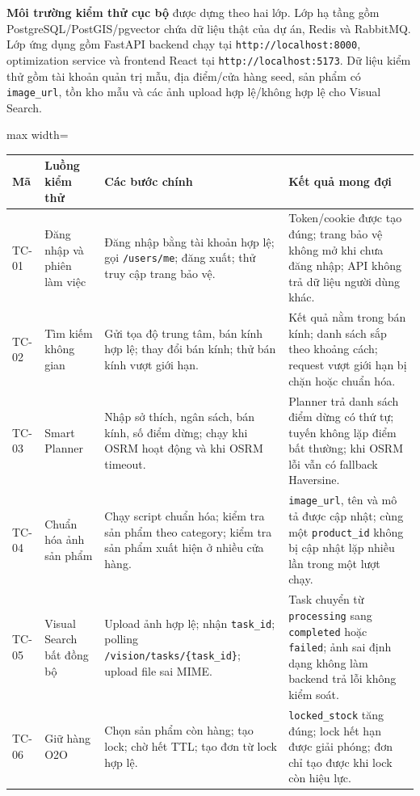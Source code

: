 \documentclass[12pt, a4paper]{article}
\begin{document}
\textbf{Môi trường kiểm thử cục bộ} được dựng theo hai lớp. Lớp hạ tầng gồm PostgreSQL/PostGIS/pgvector chứa dữ liệu thật của dự án, Redis và RabbitMQ. Lớp ứng dụng gồm FastAPI backend chạy tại \texttt{http://localhost:8000}, optimization service và frontend React tại \texttt{http://localhost:5173}. Dữ liệu kiểm thử gồm tài khoản quản trị mẫu, địa điểm/cửa hàng seed, sản phẩm có \texttt{image\_url}, tồn kho mẫu và các ảnh upload hợp lệ/không hợp lệ cho Visual Search.

\begin{table}[H]
\centering
\renewcommand{\arraystretch}{1.25}
\scriptsize
\begin{adjustbox}{max width=\textwidth}
\begin{tabular}{|>{\raggedright\arraybackslash}p{1.5cm}|>{\raggedright\arraybackslash}p{3.0cm}|>{\raggedright\arraybackslash}p{4.8cm}|>{\raggedright\arraybackslash}p{5.2cm}|}
\hline
\textbf{Mã} & \textbf{Luồng kiểm thử} & \textbf{Các bước chính} & \textbf{Kết quả mong đợi} \\ \hline
TC-01 & Đăng nhập và phiên làm việc & Đăng nhập bằng tài khoản hợp lệ; gọi \texttt{/users/me}; đăng xuất; thử truy cập trang bảo vệ. & Token/cookie được tạo đúng; trang bảo vệ không mở khi chưa đăng nhập; API không trả dữ liệu người dùng khác. \\ \hline
TC-02 & Tìm kiếm không gian & Gửi tọa độ trung tâm, bán kính hợp lệ; thay đổi bán kính; thử bán kính vượt giới hạn. & Kết quả nằm trong bán kính; danh sách sắp theo khoảng cách; request vượt giới hạn bị chặn hoặc chuẩn hóa. \\ \hline
TC-03 & Smart Planner & Nhập sở thích, ngân sách, bán kính, số điểm dừng; chạy khi OSRM hoạt động và khi OSRM timeout. & Planner trả danh sách điểm dừng có thứ tự; tuyến không lặp điểm bất thường; khi OSRM lỗi vẫn có fallback Haversine. \\ \hline
TC-04 & Chuẩn hóa ảnh sản phẩm & Chạy script chuẩn hóa; kiểm tra sản phẩm theo category; kiểm tra sản phẩm xuất hiện ở nhiều cửa hàng. & \texttt{image\_url}, tên và mô tả được cập nhật; cùng một \texttt{product\_id} không bị cập nhật lặp nhiều lần trong một lượt chạy. \\ \hline
TC-05 & Visual Search bất đồng bộ & Upload ảnh hợp lệ; nhận \texttt{task\_id}; polling \texttt{/vision/tasks/\{task\_id\}}; upload file sai MIME. & Task chuyển từ \texttt{processing} sang \texttt{completed} hoặc \texttt{failed}; ảnh sai định dạng không làm backend trả lỗi không kiểm soát. \\ \hline
TC-06 & Giữ hàng O2O & Chọn sản phẩm còn hàng; tạo lock; chờ hết TTL; tạo đơn từ lock hợp lệ. & \texttt{locked\_stock} tăng đúng; lock hết hạn được giải phóng; đơn chỉ tạo được khi lock còn hiệu lực. \\ \hline

\end{tabular}
\end{adjustbox}
\end{table}
\end{document}
